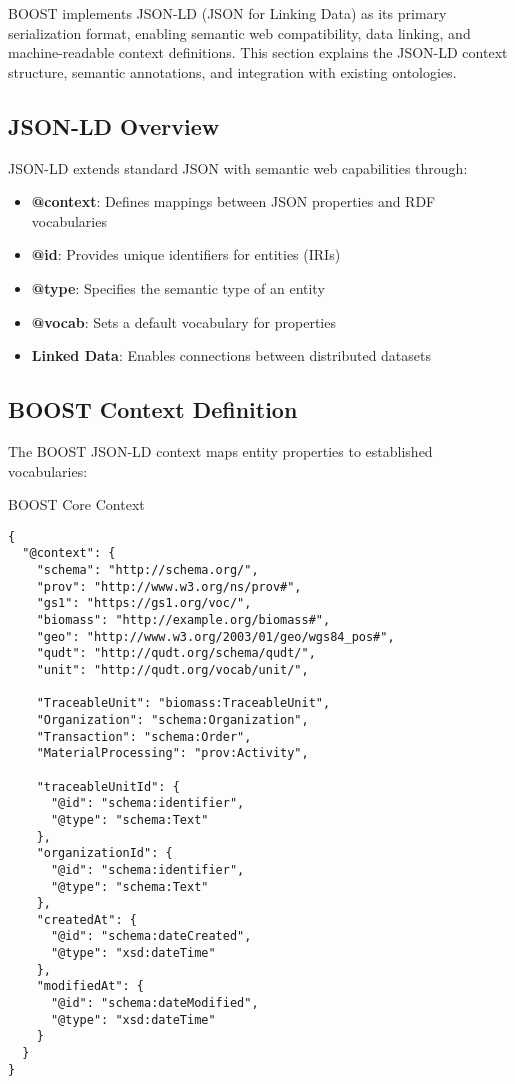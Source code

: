 
BOOST implements JSON-LD (JSON for Linking Data) as its primary serialization format, enabling semantic web compatibility, data linking, and machine-readable context definitions. This section explains the JSON-LD context structure, semantic annotations, and integration with existing ontologies.

\subsection{JSON-LD Overview}
\label{sec:jsonld-overview}

JSON-LD extends standard JSON with semantic web capabilities through:

\begin{itemize}
    \item \textbf{@context}: Defines mappings between JSON properties and RDF vocabularies
    \item \textbf{@id}: Provides unique identifiers for entities (IRIs)
    \item \textbf{@type}: Specifies the semantic type of an entity
    \item \textbf{@vocab}: Sets a default vocabulary for properties
    \item \textbf{Linked Data}: Enables connections between distributed datasets
\end{itemize}

\subsection{BOOST Context Definition}
\label{sec:boost-context}

The BOOST JSON-LD context maps entity properties to established vocabularies:

\begin{jsonexample}{BOOST Core Context}
\begin{verbatim}
{
  "@context": {
    "schema": "http://schema.org/",
    "prov": "http://www.w3.org/ns/prov#",
    "gs1": "https://gs1.org/voc/",
    "biomass": "http://example.org/biomass#",
    "geo": "http://www.w3.org/2003/01/geo/wgs84_pos#",
    "qudt": "http://qudt.org/schema/qudt/",
    "unit": "http://qudt.org/vocab/unit/",
    
    "TraceableUnit": "biomass:TraceableUnit",
    "Organization": "schema:Organization",
    "Transaction": "schema:Order",
    "MaterialProcessing": "prov:Activity",
    
    "traceableUnitId": {
      "@id": "schema:identifier",
      "@type": "schema:Text"
    },
    "organizationId": {
      "@id": "schema:identifier",
      "@type": "schema:Text"
    },
    "createdAt": {
      "@id": "schema:dateCreated",
      "@type": "xsd:dateTime"
    },
    "modifiedAt": {
      "@id": "schema:dateModified",
      "@type": "xsd:dateTime"
    }
  }
}
\end{verbatim}
\end{jsonexample}

